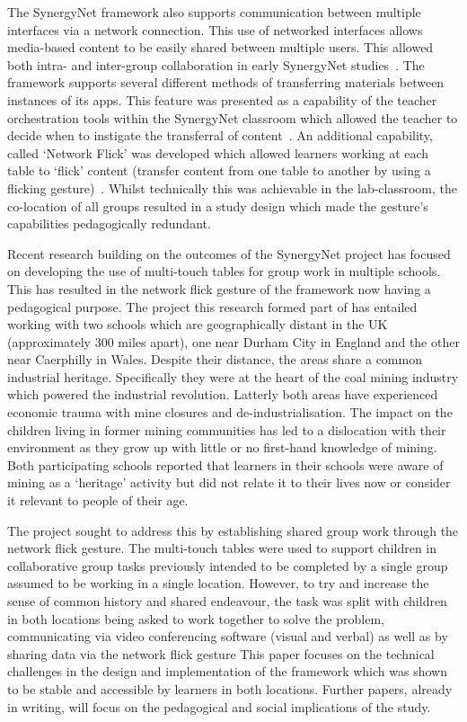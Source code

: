 \documentclass[a4paper,11pt]{article}
\begin{document}
The SynergyNet framework also supports communication between multiple interfaces via a network connection.
This use of networked interfaces allows media-based content to be easily shared between multiple users.
This allowed both intra- and inter-group collaboration in early SynergyNet studies~\cite{mercier:2014b}.
The framework supports several different methods of transferring materials between instances of its apps.
This feature was presented as a capability of the teacher orchestration tools within the SynergyNet classroom which allowed the teacher to decide when to instigate the transferral of content~\cite{alagha-et-al:2010,mercier:2016}.
An additional capability, called `Network Flick' was developed which allowed learners working at each table to ‘flick’ content (transfer content from one table to another by using a flicking gesture)~\cite{reetz-et-al:2006}.
Whilst technically this was achievable in the lab-classroom, the co-location of all groups resulted in a study design which made the gesture’s capabilities pedagogically redundant.

Recent research building on the outcomes of the SynergyNet project has focused on developing the use of multi-touch tables for group work in multiple schools.
This has resulted in the network flick gesture of the framework now having a pedagogical purpose.
The project this research formed part of has entailed working with two schools which are geographically distant in the UK (approximately 300 miles apart), one near Durham City in England and the other near Caerphilly in Wales.
Despite their distance, the areas share a common industrial heritage.
Specifically they were at the heart of the coal mining industry which powered the industrial revolution.
Latterly both areas have experienced economic trauma with mine closures and de-industrialisation.
The impact on the children living in former mining communities has led to a dislocation with their environment as they grow up with little or no first-hand knowledge of mining.
Both participating schools reported that learners in their schools were aware of mining as a ‘heritage’ activity but did not relate it to their lives now or consider it relevant to people of their age.

The project sought to address this by establishing shared group work through the network flick gesture.
The multi-touch tables were used to support children in collaborative group tasks previously intended to be completed by a single group assumed to be working in a single location.
However, to try and increase the sense of common history and shared endeavour, the task was split with children in both locations being asked to work together to solve the problem, communicating via video conferencing software (visual and verbal) as well as by sharing data via the network flick gesture
This paper focuses on the technical challenges in the design and implementation of the framework which was shown to be stable and accessible by learners in both locations.
Further papers, already in writing, will focus on the pedagogical and social implications of the study.
\end{document}
